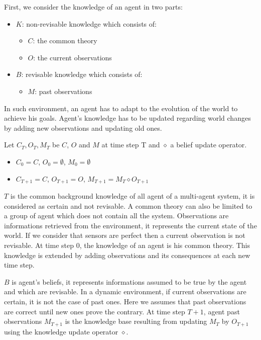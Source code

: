 \documentclass{aamas2012}
\begin{document}
	First, we consider the knowledge of an agent in two parts:
	\begin{itemize}
		\item $K$: non-revisable knowledge which consists of:
		\begin{itemize}
			\item $C$: the common theory
			\item $O$: the current observations
		\end{itemize}
		\item $B$: revisable knowledge which consists of:
		\begin{itemize}
			\item $M$: past observations 
		\end{itemize}
	\end{itemize}
		
	In such environment, an agent has to adapt to the evolution of the world to achieve his goals.
	Agent's knowledge has to be updated regarding world changes by adding new observations and updating old ones.
	
	Let $C_{T}, O_{T}, M_{T}$ be $C$, $O$ and $M$ at time step T and $\diamond$ a belief update operator.
	\begin{itemize}
		\item $C_{0} = C$, $O_{0} = \emptyset$, $M_{0} = \emptyset$
		\item $C_{T+1} = C$, $O_{T+1} = O$, $M_{T+1} = M_{T} \diamond O_{T+1}$
	\end{itemize}
	
	$T$ is the common background knowledge of all agent of a multi-agent system, it is considered as certain and not revisable.
	A common theory can also be limited to a group of agent which does not contain all the system.
	Observations are informations retrieved from the environment, it represents the current state of the world.
	If we consider that sensors are perfect then a current observation is not revisable.
	At time step 0, the knowledge of an agent is his common theory.
	This knowledge is extended by adding observations and its consequences at each new time step.

	$B$ is agent's beliefs, it represents informations assumed to be true by the agent and which are revisable.
	In a dynamic environment, if current observations are certain, it is not the case of past ones.
	Here we assumes that past observations are correct until new ones prove the contrary.
	At time step $T+1$, agent past observations $M_{T+1}$ is the knowledge base resulting from updating $M_{T}$ by $O_{T+1}$ using the knowledge update operator $\diamond$.
\end{document}

